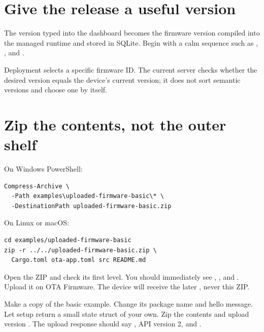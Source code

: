 \section{Give the release a useful version}

The version typed into the dashboard becomes the firmware version compiled into the managed runtime and stored in SQLite. Begin with a calm sequence such as , , and .

Deployment selects a specific firmware ID. The current server checks whether the desired version equals the device's current version; it does not sort semantic versions and choose one by itself.

\section{Zip the contents, not the outer shelf}

On Windows PowerShell:

\begin{lstlisting}
Compress-Archive \
  -Path examples\uploaded-firmware-basic\* \
  -DestinationPath uploaded-firmware-basic.zip
\end{lstlisting}

On Linux or macOS:

\begin{lstlisting}
cd examples/uploaded-firmware-basic
zip -r ../../uploaded-firmware-basic.zip \
  Cargo.toml ota-app.toml src README.md
\end{lstlisting}

Open the ZIP and check its first level. You should immediately see , , and . Upload it on OTA Firmware. The device will receive the later , never this ZIP.

\begin{checkpoint}
Make a copy of the basic example. Change its package name and hello message. Let setup return a small state struct of your own. Zip the contents and upload version \codepath{1.0.1}. The upload response should say , API version 2, and .
\end{checkpoint}

